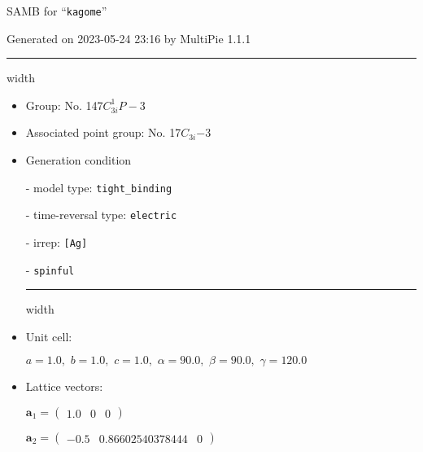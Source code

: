 \documentclass[fleqn,10pt,landscape]{article}
\begin{document}
\setcounter{MaxMatrixCols}{16}

\setlength{\baselineskip}{16pt}
\footnotesize
\begin{center}
\LARGE
SAMB for ``\texttt{kagome}''
\end{center}
\begin{flushright}
Generated on 2023-05-24 23:16 by MultiPie 1.1.1
\end{flushright}
\vspace{1cm}


 \hfil \hrule height 1mm width \textwidth \hfil

\begin{itemize}
\item Group: No. 147\quad$C_{3i}^{1}$\quad$P-3$\quad[ trigonal ]

\item Associated point group: No. 17\quad$C_{3i}$\quad$-3$\quad[ trigonal ]

\vspace{5mm}

\item Generation condition

\quad - model type: \texttt{tight_binding}

\quad - time-reversal type: \texttt{electric}

\quad - irrep: \texttt{[Ag]}

\quad - \texttt{spinful}


 \hfil \hrule height 1mm width \textwidth \hfil

\item Unit cell:

\quad $a=1.0,\,\, b=1.0,\,\, c=1.0,\,\, \alpha=90.0,\,\, \beta=90.0,\,\, \gamma=120.0$

\item Lattice vectors:

\quad $\bm{a}_1=\begin{pmatrix} 1.0 & 0 & 0 \end{pmatrix}$

\quad $\bm{a}_2=\begin{pmatrix} -0.5 & 0.86602540378444 & 0 \end{pmatrix}$


\end{itemize}
\end{document}
